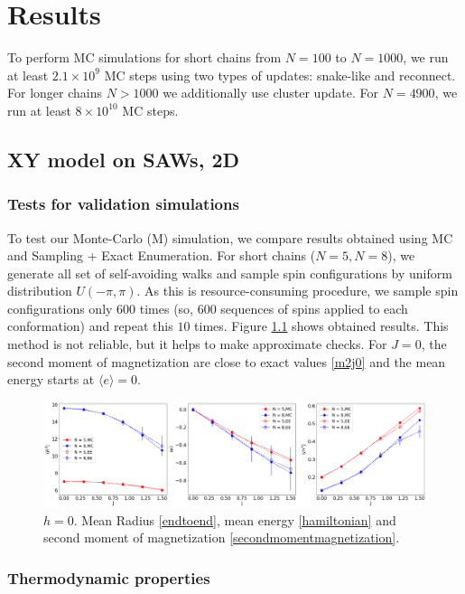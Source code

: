 \chapter{Results} \label{ch:results}
To perform MC simulations for short chains from $N=100$ to $N=1000$, we run at least $2.1 \times 10^9$ MC steps using two  types of updates: snake-like and reconnect. For longer chains $N>1000$ we additionally use cluster update. For $N=4900$, we run at least $8 \times 10^10 $ MC steps. 
\section{XY model on SAWs, 2D}
\subsection{Tests for validation simulations}
To test our Monte-Carlo (M) simulation, we compare results obtained using MC and Sampling + Exact Enumeration. For short chains ($N=5, N=8$), we generate all set of self-avoiding walks and sample spin configurations by uniform distribution $U(-\pi, \pi)$. As this is resource-consuming procedure, we sample spin configurations only $600$ times (so, 600 sequences of spins applied to each conformation) and repeat this $10$ times. Figure \ref{fig:ee} shows obtained results. This method is not reliable, but it helps to make approximate checks. For $J=0$, the second moment of magnetization are close to exact values \eqref{m2j0} and the mean energy starts at $\langle e \rangle = 0$.

 \begin{figure}[H]
	\centering
	\includegraphics[scale=0.26]{Images/EE.png}
	\caption{$h=0$. Mean Radius \eqref{endtoend}, mean energy \eqref{hamiltonian} and   second moment of magnetization \eqref{secondmomentmagnetization}.   }
	\label{fig:ee}
\end{figure}


\subsection{Thermodynamic properties}
 
